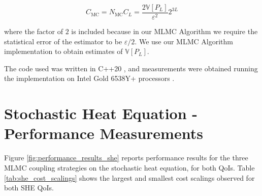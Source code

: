 \begin{equation*}
    C_{\mathrm{MC}} = N_{\mathrm{MC}} C_L = \frac{2 \mathbb{V}[P_L]}{\varepsilon^2}2^{3L}
\end{equation*}

where the factor of $2$ is included because in our MLMC Algorithm we 
require the statistical error of the estimator to be $\varepsilon / 2$.
We use our MLMC Algorithm implementation to obtain estimates of 
$\mathbb{V}[P_L]$.

The code used was written in C++20 \cite{cpp20standard}, 
and measurements were obtained running the implementation on Intel Gold 6538Y+ processors
\cite{intel_xeon_gold_6538y}.

\section{Stochastic Heat Equation - Performance Measurements}

Figure \ref{fig:performance_results_she} reports performance results for the three MLMC 
coupling strategies on the stochastic heat equation, for both QoIs. Table 
\ref{tab:she_cost_scalings} shows the largest and smallest cost scalings 
observed for both SHE QoIs.

